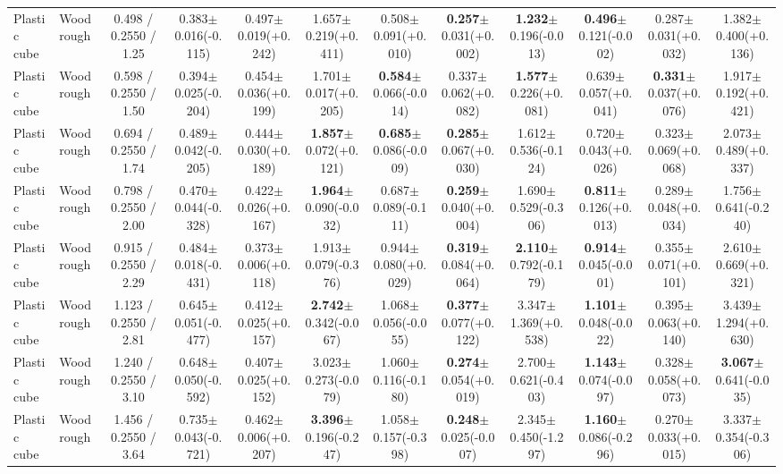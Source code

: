 \begin{table}[t]
{\begin{tabular}{l l c c c c c c c c c c }
        Plastic cube & Wood rough & 0.498 / 0.2550 / 1.25 & 0.383$\pm$0.016(-0.115) & 0.497$\pm$0.019(+0.242) & 1.657$\pm$0.219(+0.411) & 0.508$\pm$0.091(+0.010) & \textbf{0.257}$\pm$0.031(+0.002) & \textbf{1.232}$\pm$0.196(-0.013) & \textbf{0.496}$\pm$0.121(-0.002) & 0.287$\pm$0.031(+0.032) & 1.382$\pm$0.400(+0.136) \\
        Plastic cube & Wood rough & 0.598 / 0.2550 / 1.50 & 0.394$\pm$0.025(-0.204) & 0.454$\pm$0.036(+0.199) & 1.701$\pm$0.017(+0.205) & \textbf{0.584}$\pm$0.066(-0.014) & 0.337$\pm$0.062(+0.082) & \textbf{1.577}$\pm$0.226(+0.081) & 0.639$\pm$0.057(+0.041) & \textbf{0.331}$\pm$0.037(+0.076) & 1.917$\pm$0.192(+0.421) \\
        Plastic cube & Wood rough & 0.694 / 0.2550 / 1.74 & 0.489$\pm$0.042(-0.205) & 0.444$\pm$0.030(+0.189) & \textbf{1.857}$\pm$0.072(+0.121) & \textbf{0.685}$\pm$0.086(-0.009) & \textbf{0.285}$\pm$0.067(+0.030) & 1.612$\pm$0.536(-0.124) & 0.720$\pm$0.043(+0.026) & 0.323$\pm$0.069(+0.068) & 2.073$\pm$0.489(+0.337) \\
        Plastic cube & Wood rough & 0.798 / 0.2550 / 2.00 & 0.470$\pm$0.044(-0.328) & 0.422$\pm$0.026(+0.167) & \textbf{1.964}$\pm$0.090(-0.032) & 0.687$\pm$0.089(-0.111) & \textbf{0.259}$\pm$0.040(+0.004) & 1.690$\pm$0.529(-0.306) & \textbf{0.811}$\pm$0.126(+0.013) & 0.289$\pm$0.048(+0.034) & 1.756$\pm$0.641(-0.240) \\
        Plastic cube & Wood rough & 0.915 / 0.2550 / 2.29 & 0.484$\pm$0.018(-0.431) & 0.373$\pm$0.006(+0.118) & 1.913$\pm$0.079(-0.376) & 0.944$\pm$0.080(+0.029) & \textbf{0.319}$\pm$0.084(+0.064) & \textbf{2.110}$\pm$0.792(-0.179) & \textbf{0.914}$\pm$0.045(-0.001) & 0.355$\pm$0.071(+0.101) & 2.610$\pm$0.669(+0.321) \\
        Plastic cube & Wood rough & 1.123 / 0.2550 / 2.81 & 0.645$\pm$0.051(-0.477) & 0.412$\pm$0.025(+0.157) & \textbf{2.742}$\pm$0.342(-0.067) & 1.068$\pm$0.056(-0.055) & \textbf{0.377}$\pm$0.077(+0.122) & 3.347$\pm$1.369(+0.538) & \textbf{1.101}$\pm$0.048(-0.022) & 0.395$\pm$0.063(+0.140) & 3.439$\pm$1.294(+0.630) \\
        Plastic cube & Wood rough & 1.240 / 0.2550 / 3.10 & 0.648$\pm$0.050(-0.592) & 0.407$\pm$0.025(+0.152) & 3.023$\pm$0.273(-0.079) & 1.060$\pm$0.116(-0.180) & \textbf{0.274}$\pm$0.054(+0.019) & 2.700$\pm$0.621(-0.403) & \textbf{1.143}$\pm$0.074(-0.097) & 0.328$\pm$0.058(+0.073) & \textbf{3.067}$\pm$0.641(-0.035) \\
        Plastic cube & Wood rough & 1.456 / 0.2550 / 3.64 & 0.735$\pm$0.043(-0.721) & 0.462$\pm$0.006(+0.207) & \textbf{3.396}$\pm$0.196(-0.247) & 1.058$\pm$0.157(-0.398) & \textbf{0.248}$\pm$0.025(-0.007) & 2.345$\pm$0.450(-1.297) & \textbf{1.160}$\pm$0.086(-0.296) & 0.270$\pm$0.033(+0.015) & 3.337$\pm$0.354(-0.306) \\

\end{tabular}}
\end{table}
